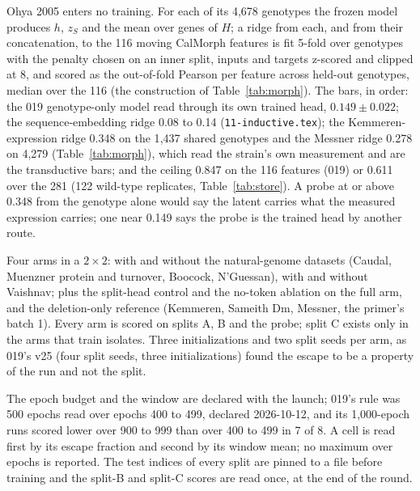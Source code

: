 Ohya 2005 enters no training. For each of its 4{,}678 genotypes the frozen model produces
$h$, $z_S$ and the mean over genes of $H$; a ridge from each, and from their
concatenation, to the 116 moving CalMorph features is fit 5-fold over genotypes with the
penalty chosen on an inner split, inputs and targets z-scored and clipped at 8, and
scored as the out-of-fold Pearson per feature across held-out genotypes, median over the
116 (the construction of Table~\ref{tab:morph}). The bars, in order: the 019 genotype-only
model read through its own trained head, $0.149 \pm 0.022$; the sequence-embedding ridge
0.08 to 0.14 (\texttt{11-inductive.tex}); the Kemmeren-expression ridge 0.348 on the
1{,}437 shared genotypes and the Messner ridge 0.278 on 4{,}279 (Table~\ref{tab:morph}),
which read the strain's own measurement and are the transductive bars; and the ceiling
0.847 on the 116 features (019) or 0.611 over the 281 (122 wild-type replicates,
Table~\ref{tab:store}). A probe at or above 0.348 from the genotype alone would say the
latent carries what the measured expression carries; one near 0.149 says the probe is the
trained head by another route.

Four arms in a $2 \times 2$: with and without the natural-genome datasets (Caudal,
Muenzner protein and turnover, Boocock, N'Guessan), with and without Vaishnav; plus the
split-head control and the no-token ablation on the full arm, and the deletion-only
reference (Kemmeren, Sameith Dm, Messner, the primer's batch 1). Every arm is scored on
splits A, B and the probe; split C exists only in the arms that train isolates. Three
initializations and two split seeds per arm, as 019's v25 (four split seeds, three
initializations) found the escape to be a property of the run and not the split.

The epoch budget and the window are declared with the launch; 019's rule was 500 epochs
read over epochs 400 to 499, declared 2026-10-12, and its 1{,}000-epoch runs scored lower
over 900 to 999 than over 400 to 499 in 7 of 8. A cell is read first by its escape
fraction and second by its window mean; no maximum over epochs is reported. The test
indices of every split are pinned to a file before training and the split-B and split-C
scores are read once, at the end of the round.

